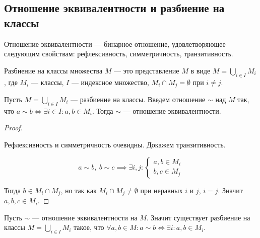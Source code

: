 \subsection{Отношение эквивалентности и разбиение на классы}

\begin{defn}
    Отношение эквивалентности --- бинарное отношение, 
    удовлетворяющее следующим свойствам: рефлексивность, симметричность, транзитивность.
\end{defn}

\begin{defn}
    Разбиение на классы множества $M$ --- это представление $M$ в виде 
    $M = \bigcup\limits_{i \in I} M_i$, 
    где $M_i$ --- классы, $I$ --- индексное множество, 
    $M_i \cap M_j = \emptyset$ при $i \neq j$.
\end{defn}

\begin{theorem}
    Пусть $M = \bigcup\limits_{i \in I} M_i$ --- разбиение на классы.
    Введем отношение $\sim$ над $M$ так, что $a \sim b \iff \exists i \in I : a, b \in M_i$.
    Тогда $\sim$ --- отношение эквивалентности.
\end{theorem}

\begin{proof}~

    Рефлексивность и симметричность очевидны. Докажем транзитивность.
    
    \[ 
        a \sim b,\ b \sim c \implies 
        \exists i, j : \begin{cases} a, b \in M_i \\ b, c \in M_j \end{cases}
    \]
    
    Тогда $b \in M_i \cap M_j$, но так как $M_i \cap M_j \neq \emptyset$ при неравных $i$ и $j$,
    $i = j$. Значит $a, b, c \in M_i$.
\end{proof}

\begin{theorem}
    Пусть $\sim$ --- отношение эквивалентности на $M$. 
    Значит существует разбиение на классы $M = \bigcup\limits_{i \in I} M_i$ такое, 
    что $\forall a, b \in M: a \sim b \iff \exists i : a, b \in M_i$.
\end{theorem}

